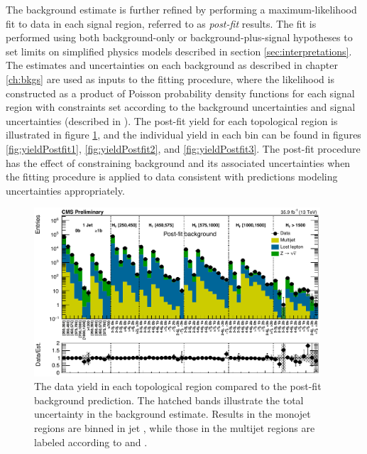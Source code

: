 The background estimate is further refined by performing a maximum-likelihood fit to data in each signal region, referred to as {\it post-fit} results. The fit is performed using both background-only or background-plus-signal hypotheses to set limits on simplified physics models described in section \ref{sec:interpretations}. The estimates and uncertainties on each background as described in chapter \ref{ch:bkgs} are  used as inputs to the fitting procedure, where the likelihood is constructed as a product of Poisson probability density functions for each signal region with constraints set according to the background uncertainties and signal uncertainties (described in ). The post-fit yield for each topological region is illustrated in figure \ref{fig:yieldPostfitTopological}, and the individual yield in each \mttwo bin can be found in figures \ref{fig:yieldPostfit1}, \ref{fig:yieldPostfit2}, and \ref{fig:yieldPostfit3}. The post-fit procedure has the effect of constraining background and its associated uncertainties when the fitting procedure is applied to data consistent with predictions modeling uncertainties appropriately.
\begin{figure}
	\centering
	\includegraphics[width=0.95\textwidth]{results/figs/postfit/mt2_ALL_fullEstimate}
	\caption{The data yield in each topological region compared to the post-fit background prediction. The hatched bands illustrate the total uncertainty in the background estimate. Results in the monojet regions are binned in jet \pt, while those in the multijet regions are labeled according to \nj and \nb.}
	\label{fig:yieldPostfitTopological}
\end{figure}
